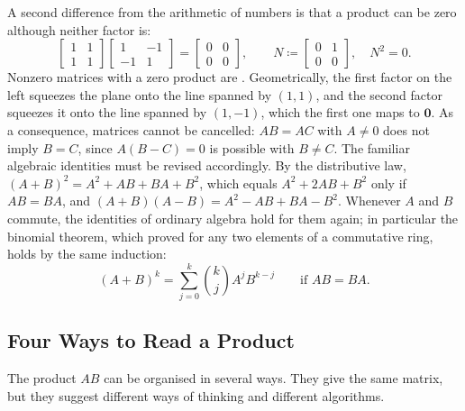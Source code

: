 A second difference from the arithmetic of numbers is that a product can be zero although neither factor is:
\[
\begin{bmatrix}1&1\\1&1\end{bmatrix}\begin{bmatrix}1&-1\\-1&1\end{bmatrix}=\begin{bmatrix}0&0\\0&0\end{bmatrix},\qquad N\coloneqq\begin{bmatrix}0&1\\0&0\end{bmatrix},\quad N^2=0 .
\]
Nonzero matrices with a zero product are . Geometrically, the first factor on the left squeezes the plane onto the line spanned by $(1,1)$, and the second factor squeezes it onto the line spanned by $(1,-1)$, which the first one maps to $\mathbf 0$. As a consequence, matrices cannot be cancelled: $AB=AC$ with $A\ne0$ does not imply $B=C$, since $A(B-C)=0$ is possible with $B\ne C$. The familiar algebraic identities must be revised accordingly. By the distributive law, $(A+B)^2=A^2+AB+BA+B^2$, which equals $A^2+2AB+B^2$ only if $AB=BA$, and $(A+B)(A-B)=A^2-AB+BA-B^2$. Whenever $A$ and $B$ commute, the identities of ordinary algebra hold for them again; in particular the binomial theorem, which  proved for any two elements of a commutative ring, holds by the same induction:
\[
(A+B)^k=\sum_{j=0}^k\binom kjA^jB^{k-j}\qquad\text{if }AB=BA .
\]

\subsection{Four Ways to Read a Product}

The product $AB$ can be organised in several ways. They give the same matrix, but they suggest different ways of thinking and different algorithms.

